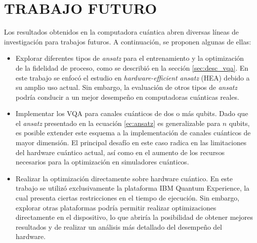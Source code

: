 \documentclass[letterpaper,12pt]{thesisECFM}
\theoremstyle{plain}
\theoremstyle{definition}
\theoremstyle{definition}
\theoremstyle{remark}
\newcommand{\1}{\mathbb{1}}
\begin{document}
\chapter{TRABAJO FUTURO} %
Los resultados obtenidos en la computadora cuántica abren diversas líneas de
investigación para trabajos futuros. A continuación, se proponen algunas de
ellas: 
\begin{itemize}
    \item Explorar diferentes tipos de \textit{ansatz} para el entrenamiento y la optimización de la fidelidad de proceso, como se describió en la sección \ref{sec:desc_vqa}. En este trabajo se enfocó el estudio en \textit{hardware-efficient ansatz} (HEA) debido a su amplio uso actual. Sin embargo, la evaluación de otros tipos de \textit{ansatz} podría conducir a un mejor desempeño en computadoras cuánticas reales.
    
    \item Implementar los VQA para canales cuánticos de dos o más qubits. Dado que el \textit{ansatz} presentado en la ecuación \ref{ec:ansatz} es generalizable para $n$ qubits, es posible extender este esquema a la implementación de canales cuánticos de mayor dimensión. El principal desafío en este caso radica en las limitaciones del hardware cuántico actual, así como en el aumento de los recursos necesarios para la optimización en simuladores cuánticos.
    
    \item Realizar la optimización directamente sobre hardware cuántico. En este trabajo se utilizó exclusivamente la plataforma IBM Quantum Experience, la cual presenta ciertas restricciones en el tiempo de ejecución. Sin embargo, explorar otras plataformas podría permitir realizar optimizaciones directamente en el dispositivo, lo que abriría la posibilidad de obtener mejores resultados y de realizar un análisis más detallado del desempeño del hardware.
\end{itemize}



\end{document}
